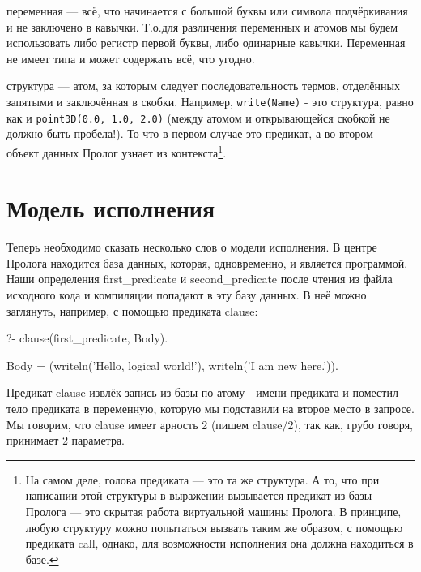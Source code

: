 \documentclass[a4paper]{book}
\def\To{Т.\thinspace о.}
\begin{document}
\begin{description}
  \item переменная --- всё, что начинается с большой буквы или
    символа подчёркивания и не заключено в кавычки. \To для
    различения переменных и атомов мы будем использовать либо
    регистр первой буквы, либо одинарные кавычки. Переменная не
    имеет типа и может содержать всё, что угодно.

  \item структура --- атом, за которым следует последовательность
    термов, отделённых запятыми и заключённая в скобки. Например,
    \verb|write(Name)| - это структура, равно как и
    \verb|point3D(0.0, 1.0, 2.0)| (между атомом и открывающейся
    скобкой не должно быть пробела!). То что в первом случае это
    предикат, а во втором - объект данных Пролог узнает из
    контекста\footnote{На самом деле, голова предиката --- это та
      же структура. А то, что при написании этой структуры в
      выражении вызывается предикат из базы Пролога --- это
      скрытая работа виртуальной машины Пролога. В принципе,
      любую структуру можно попытаться вызвать таким же образом,
      с помощью предиката call, однако, для возможности
      исполнения она должна находиться в базе.}.
\end{description}

\section{Модель исполнения}
\label{prolog_execution_model}

Теперь необходимо сказать несколько слов о модели исполнения.  В
центре Пролога находится база данных, которая, одновременно, и
является программой. Наши определения first_predicate и
second_predicate после чтения из файла исходного кода и
компиляции попадают в эту базу данных. В неё можно заглянуть,
например, с помощью предиката clause:

\begin{example}{}{}
?- clause(first_predicate, Body).

Body = (writeln('Hello, logical world!'), writeln('I am new here.')).                                                       
\end{example}

Предикат clause извлёк запись из базы по атому - имени
предиката и поместил тело предиката в переменную, которую мы
подставили на второе место в запросе. Мы говорим, что clause
имеет арность 2 (пишем clause/2), так как, грубо говоря,
принимает 2 параметра.
\end{document}
